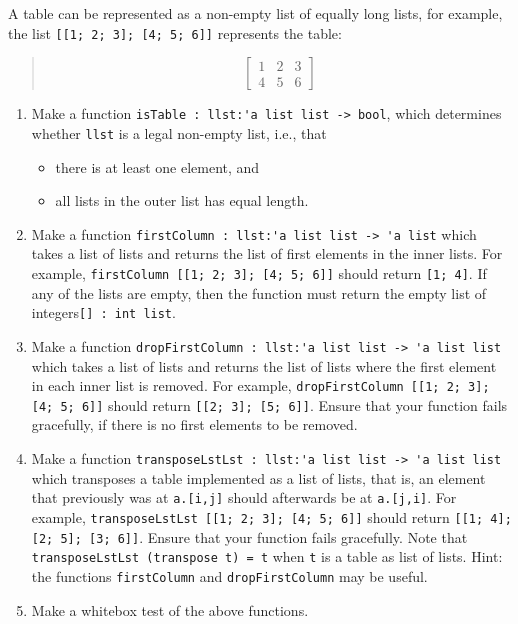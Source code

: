 A table can be represented as a non-empty list of equally long lists, for example, the list \lstinline{[[1; 2; 3]; [4; 5; 6]]} represents the table:
  \begin{quote}
\[\left [\begin{array}{rrr}
1 & 2 & 3 \\
4 & 5 & 6
\end{array}
\right ]\]
\end{quote}
\begin{enumerate}
\item Make a function \lstinline{isTable : llst:'a list list -> bool}, which determines whether \lstinline{llst} is a legal non-empty list, i.e., that
  \begin{itemize}
  \item there is at least one element, and
  \item all lists in the outer list has equal length.
  \end{itemize}
\item Make a function \lstinline{firstColumn : llst:'a list list -> 'a list} which takes a list of lists and returns the list of first elements in the inner lists.  For example, \lstinline{firstColumn [[1; 2; 3]; [4; 5; 6]]} should return \lstinline{[1; 4]}.  If any of the lists are empty, then the function must return the empty list of integers\lstinline{[] : int list}.
\item Make a function \lstinline{dropFirstColumn : llst:'a list list -> 'a list list} which takes a list of lists and returns the list of lists where the first element in each inner list is removed. For example, \lstinline{dropFirstColumn [[1; 2; 3]; [4; 5; 6]]} should return \lstinline{[[2; 3]; [5; 6]]}. Ensure that your function fails gracefully, if there is no first elements to be removed.
\item \label{listTranspose}Make a function \lstinline{transposeLstLst : llst:'a list list -> 'a list list} which transposes a table implemented as a list of lists, that is, an element that previously was at \lstinline{a.[i,j]} should afterwards be at \lstinline{a.[j,i]}. For example, \lstinline{transposeLstLst [[1; 2; 3]; [4; 5; 6]]} should return \lstinline{[[1; 4]; [2; 5]; [3; 6]]}.  Ensure that your function fails gracefully. Note that \lstinline{transposeLstLst (transpose t) = t} when \lstinline{t} is a table as list of lists. Hint: the functions \lstinline{firstColumn} and \lstinline{dropFirstColumn} may be useful.
\item Make a whitebox test of the above functions.
\end{enumerate}
